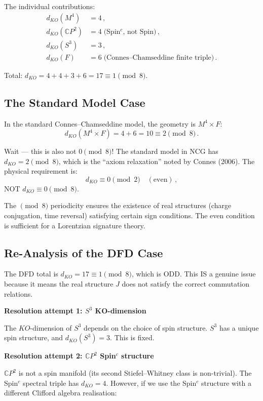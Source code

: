 \documentclass[11pt,a4paper]{article}
\newcommand{\CP}{\mathbb{C}P}
\begin{document}
The individual contributions:
\begin{align}
d_{KO}(M^4) &= 4\,, \\
d_{KO}(\CP^2) &= 4\;\text{(Spin$^c$, not Spin)}\,, \\
d_{KO}(S^3) &= 3\,, \\
d_{KO}(F) &= 6\;\text{(Connes--Chamseddine finite triple)}\,.
\end{align}

Total: $d_{KO} = 4 + 4 + 3 + 6 = 17 \equiv 1 \pmod{8}$.

\subsection{The Standard Model Case}

In the standard Connes--Chamseddine model, the geometry is $M^4 \times F$:
\begin{equation}
d_{KO}(M^4 \times F) = 4 + 6 = 10 \equiv 2 \pmod{8}\,.
\end{equation}

Wait --- this is also not $0 \pmod 8$! The standard model in NCG has $d_{KO} = 2 \pmod{8}$, which is the ``axiom relaxation'' noted by Connes (2006). The physical requirement is:
\begin{equation}
d_{KO} \equiv 0 \pmod{2}\quad (\text{even})\,,
\end{equation}
NOT $d_{KO} \equiv 0 \pmod{8}$.

The $\pmod{8}$ periodicity ensures the existence of real structures (charge conjugation, time reversal) satisfying certain sign conditions. The even condition is sufficient for a Lorentzian signature theory.

\subsection{Re-Analysis of the DFD Case}

The DFD total is $d_{KO} = 17 \equiv 1 \pmod{8}$, which is ODD. This IS a genuine issue because it means the real structure $J$ does not satisfy the correct commutation relations.

\textbf{Resolution attempt 1: $S^3$ KO-dimension}

The $KO$-dimension of $S^3$ depends on the choice of spin structure. $S^3$ has a unique spin structure, and $d_{KO}(S^3) = 3$. This is fixed.

\textbf{Resolution attempt 2: $\CP^2$ Spin$^c$ structure}

$\CP^2$ is not a spin manifold (its second Stiefel--Whitney class is non-trivial). The Spin$^c$ spectral triple has $d_{KO} = 4$. However, if we use the Spin$^c$ structure with a different Clifford algebra realisation:
\end{document}
